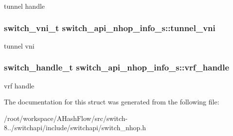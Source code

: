 tunnel handle \hypertarget{structswitch__api__nhop__info__s_a1038ee9d9d4c4e1ba6dac9410abda7f6}{
\subsubsection[{tunnel\+\_\+vni}]{\setlength{\rightskip}{0pt plus 5cm}switch\+\_\+vni\+\_\+t switch\+\_\+api\+\_\+nhop\+\_\+info\+\_\+s\+::tunnel\+\_\+vni}}\label{structswitch__api__nhop__info__s_a1038ee9d9d4c4e1ba6dac9410abda7f6}
tunnel vni \hypertarget{structswitch__api__nhop__info__s_adc3d40c153b06734b7380c240b88bedd}{
\subsubsection[{vrf\+\_\+handle}]{\setlength{\rightskip}{0pt plus 5cm}switch\+\_\+handle\+\_\+t switch\+\_\+api\+\_\+nhop\+\_\+info\+\_\+s\+::vrf\+\_\+handle}}\label{structswitch__api__nhop__info__s_adc3d40c153b06734b7380c240b88bedd}
vrf handle 

The documentation for this struct was generated from the following file\+:\begin{DoxyCompactItemize}
\item 
/root/workspace/\+A\+Hash\+Flow/src/switch-\/8../switchapi/include/switchapi/switch\+\_\+nhop.\+h\end{DoxyCompactItemize}

